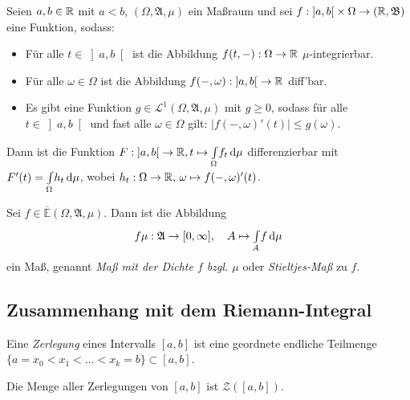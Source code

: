 \documentclass{cheat-sheet}
\newcommand{\Alg}{\mathfrak{A}} %
\newcommand{\Bor}{\mathfrak{B}} %
\newcommand{\E}{\mathbb{E}} %
\newcommand{\Leb}{\mathcal{L}} %
\theoremstyle{definition}
\newcommand{\IntOmu}[1]{\Int{\Omega}{}{#1}{\mu}} %
\begin{document}
\vspace{-20pt}

\begin{satz}
  Seien $a, b \in \mathbb{R}$ mit $a < b$, $(\Omega, \Alg, \mu)$ ein Maßraum und sei $f : \left]a, b\right[ \times \Omega \to (\R, \Bor)$ eine Funktion, sodass:
  \begin{itemize}
    \item Für alle $t \in \left]a, b\right[$ ist die Abbildung $f(t, -) : \Omega \to \mathbb{R}$ $\mu$-integrierbar.
    \item Für alle $\omega \in \Omega$ ist die Abbildung $f(-, \omega) : \left]a, b\right[ \to \mathbb{R}$ diff'bar.
    \item Es gibt eine Funktion $g \in \Leb^1(\Omega, \Alg, \mu)$ mit $g \geq 0$, sodass für alle $t \in \left]a, b\right[$ und fast alle $\omega \in \Omega$ gilt: $\left|f(-, \omega)'(t)\right| \leq g(\omega)$.
  \end{itemize}
  Dann ist die Funktion $F : \left]a, b\right[ \to \R, t \mapsto \IntOmu{f_t}$ differenzierbar mit\\[-3pt]
  $F'(t) = \IntOmu{h_t}$, wobei $h_t : \Omega \to \mathbb{R}, \, \omega \mapsto f(-, \omega)'(t)$.
\end{satz}

\begin{samepage}

\begin{satz}
  Sei $f \in \overline{\E}(\Omega, \Alg, \mu)$. Dann ist die Abbildung
  \[ f \mu : \Alg \to [0, \infty], \quad A \mapsto \Int{A}{}{f}{\mu} \]
  ein Maß, genannt \emph{Maß mit der Dichte $f$ bzgl. $\mu$} oder \emph{Stieltjes-Maß} zu $f$.
\end{satz}

\subsection{Zusammenhang mit dem Riemann-Integral}

\end{samepage}

\begin{defn}
  Eine \emph{Zerlegung} eines Intervalls $[a, b]$ ist eine geordnete endliche Teilmenge $\{ a = x_0 < x_1 < ... < x_k = b\} \subset [a, b]$.
\end{defn}

\begin{nota}
  Die Menge aller Zerlegungen von $[a, b]$ ist $\mathcal{Z}([a, b])$.
\end{nota}
\end{document}
